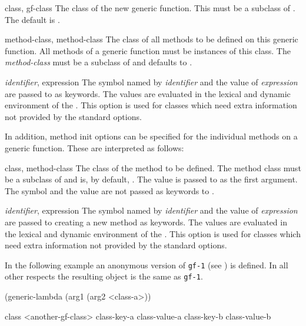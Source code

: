 \begin{optDefinition}
\begin{options}
    \item[class, gf-class] The class of the new generic function.  This must be
    a subclass of .  The default is
    .

    \item[method-class, method-class] The class of all methods to be defined on
    this generic function.  All methods of a generic function must be instances
    of this class.  The {\em method-class} must be a subclass of
     and defaults to .

    \item[{\em identifier}, expression] The symbol named by {\em identifier} and
    the value of {\em expression} are passed to  as keywords.
    The values are evaluated in the lexical and dynamic environment of the
    .  This option is used for classes which need extra
    information not provided by the standard options.
\end{options}
%
In addition, method init options can be specified for the individual
methods on a generic function.  These are interpreted as follows:
%
\begin{options}
    \item[class, method-class]%
    The class of the method to be defined. The method class must be a subclass
    of  and is, by default, . The value is
    passed to  as the first argument. The symbol and the value
    are not passed as keywords to .

    \item[{\em identifier}, expression]%
    The symbol named by {\em identifier} and the value of {\em expression} are
    passed to  creating a new method as keywords.  The values
    are evaluated in the lexical and dynamic environment of the
    .  This option is used for classes which need extra
    information not provided by the standard options.
\end{options}
%
\examples
 In the following example an anonymous version of {\tt gf-1} (see
) is defined.  In all other respects the resulting object
is the same as {\tt gf-1}.
%
{\codeExample
(generic-lambda (arg1 (arg2 <class-a>))

  class <another-gf-class>
  class-key-a class-value-a
  class-key-b class-value-b

}
\end{optDefinition}

